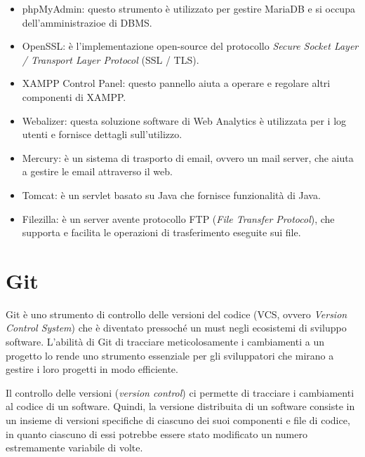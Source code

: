 \begin{itemize}
    \item phpMyAdmin: questo strumento è utilizzato per gestire MariaDB e si occupa dell'amministrazioe di DBMS.
    \item OpenSSL: è l'implementazione open-source del protocollo \textit{Secure Socket Layer / Transport Layer Protocol} (SSL / TLS).
    \item XAMPP Control Panel: questo pannello aiuta a operare e regolare altri componenti di XAMPP.
    \item Webalizer: questa soluzione software di Web Analytics è utilizzata per i log utenti e fornisce dettagli sull'utilizzo.
    \item Mercury: è un sistema di trasporto di email, ovvero un mail server, che aiuta a gestire le email attraverso il web.
    \item Tomcat: è un servlet basato su Java che fornisce funzionalità di Java.
    \item Filezilla: è un server avente protocollo FTP (\textit{File Transfer Protocol}), che supporta e facilita le operazioni di trasferimento eseguite sui file.
\end{itemize}


\section{Git}
Git è uno strumento di controllo delle versioni del codice (VCS, ovvero \textit{Version Control System}) che è diventato pressoché un must negli ecosistemi di sviluppo software. L'abilità di Git di tracciare meticolosamente i cambiamenti a un progetto lo rende uno strumento essenziale per gli sviluppatori che mirano a gestire i loro progetti in modo efficiente.

Il controllo delle versioni (\textit{version control}) ci permette di tracciare i cambiamenti al codice di un software. Quindi, la versione distribuita di un software consiste in un insieme di versioni specifiche di ciascuno dei suoi componenti e file di codice, in quanto ciascuno di essi potrebbe essere stato modificato un numero estremamente variabile di volte.

